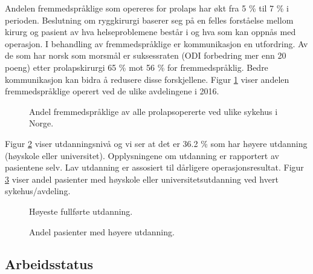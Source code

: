 Andelen fremmedspråklige som opereres for prolaps har økt fra 5 \% til 7 \% i perioden.
Beslutning om ryggkirurgi baserer seg på en felles forståelse mellom kirurg og
pasient av hva helseproblemene består i og hva som kan oppnås med operasjon. I behandling av fremmedspråklige er kommunikasjon
en utfordring. Av de som har norsk som morsmål er suksessraten (ODI forbedring mer enn 20 poeng) etter prolapskirurgi 65 \% mot 56 \%
for fremmedspråklig. Bedre kommunikasjon kan bidra å redusere disse
forskjellene. Figur \ref{fig:Morsmal} viser andelen fremmedspråklige operert ved de ulike avdelingene i 2016.


\begin{figure}[ht]
\caption{\label{fig:Morsmal} Andel fremmedspråklige av alle prolapsopererte ved ulike sykehus i
Norge.}
\end{figure}




Figur \ref{fig:Utd} viser  utdanningsnivå og vi ser at det er 36.2 \% som har høyere utdanning (høyskole eller universitet). Opplysningene om utdanning er rapportert av pasientene selv. 
Lav utdanning er assosiert til dårligere operasjonsresultat. Figur \ref{fig:HoyUtdAvd} viser andel pasienter med høyskole eller universitetsutdanning ved hvert sykehus/avdeling.

\begin{figure}[ht]
\caption{\label{fig:Utd} Høyeste fullførte utdanning.}
\end{figure}

\begin{figure}[ht]
\caption{\label{fig:HoyUtdAvd} Andel pasienter med høyere utdanning.}
\end{figure}


\clearpage

\subsection{Arbeidsstatus}

